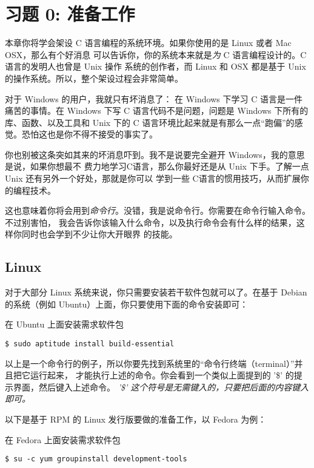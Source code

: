 \chapter{习题 0: 准备工作}

本章你将学会架设 C 语言编程的系统环境。如果你使用的是 Linux 或者 Mac OSX，那么有个好消息
可以告诉你，你的系统本来就是\emph{为} C 语言编程设计的。C 语言的发明人也曾是 Unix 操作
系统的创作者，而 Linux 和 OSX 都是基于 Unix 的操作系统。所以，整个架设过程会非常简单。

对于 Windows 的用户，我就只有坏消息了： 在 Windows 下学习 C 语言是一件痛苦的事情。在 
Windows 下写 C 语言代码不是问题，问题是 Windows 下所有的库、函数、以及工具和 Unix 下的
C 语言环境比起来就是有那么一点“跑偏”的感觉。恐怕这也是你不得不接受的事实了。

你也别被这条突如其来的坏消息吓到。我不是说要完全避开 Windows，我的意思是说，如果你想最不
费力地学习C语言，那么你最好还是从 Unix 下手。了解一点 Unix 还有另外一个好处，那就是你可以
学到一些 C语言的惯用技巧，从而扩展你的编程技术。

这也意味着你将会用到\emph{命令行}。没错，我是说命令行。你需要在命令行输入命令。不过别害怕，
我会告诉你该输入什么命令，以及执行命令会有什么样的结果，这样你同时也会学到不少让你大开眼界
的技能。

\section{Linux}

对于大部分 Linux 系统来说，你只需要安装若干软件包就可以了。在基于 Debian 的系统（例如 
Ubuntu）上面，你只要使用下面的命令安装即可：

\begin{code}{在 Ubuntu 上面安装需求软件包}
\begin{lstlisting}
$ sudo aptitude install build-essential
\end{lstlisting}
\end{code}

以上是一个命令行的例子，所以你要先找到系统里的“命令行终端（terminal）”并且把它运行起来，
才能执行上述的命令。你会看到一个类似上面提到的 '\$' 的提示界面，然后键入上述命令。\emph{
'\$' 这个符号是无需键入的，只要把后面的内容键入即可。}

以下是基于 RPM 的 Linux 发行版要做的准备工作，以 Fedora 为例：

\begin{code}{在 Fedora 上面安装需求软件包}
\begin{lstlisting}
$ su -c yum groupinstall development-tools
\end{lstlisting}
\end{code}

